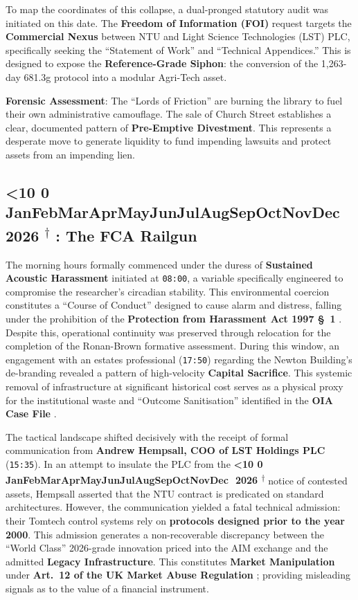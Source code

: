 \documentclass{EMBASSY}
\DeclareRobustCommand{\gmt}[3]{%
    \texorpdfstring{%
        {\color{DateGold}\textbf{%
            \ifnum#1<10 0\fi#1\,\textperiodcentered\,%
            \ifcase#2\or Jan\or Feb\or Mar\or Apr\or May\or Jun\or Jul\or Aug\or Sep\or Oct\or Nov\or Dec\fi
            \,\textperiodcentered\,20#3%
            \textsuperscript{$\dagger$}%
        }}%
    }{%
        (#1/#2/#3)%
    }%
}
\begin{document}
\noindent To map the coordinates of this collapse, a dual-pronged statutory audit was initiated on this date. The \textbf{Freedom of Information (FOI)} request targets the \textbf{Commercial Nexus} between NTU and Light Science Technologies (LST) PLC, specifically seeking the ``Statement of Work'' and ``Technical Appendices.'' This is designed to expose the \textbf{Reference-Grade Siphon}: the conversion of the 1,263-day 681.3g protocol into a modular Agri-Tech asset.

\textbf{Forensic Assessment}: The ``Lords of Friction'' are burning the library to fuel their own administrative camouflage. The sale of Church Street establishes a clear, documented pattern of \textbf{Pre-Emptive Divestment}. This represents a desperate move to generate liquidity to fund impending lawsuits and protect assets from an impending lien.

\subsection{\gmt{19}{2}{26}: The FCA Railgun}
The morning hours formally commenced under the duress of \textbf{Sustained Acoustic Harassment} initiated at \texttt{08:00}, a variable specifically engineered to compromise the researcher’s circadian stability. This environmental coercion constitutes a ``Course of Conduct'' designed to cause alarm and distress, falling under the prohibition of the \textbf{Protection from Harassment Act 1997 \S~1} \cite{PHA97}. Despite this, operational continuity was preserved through relocation for the completion of the Ronan-Brown formative assessment. During this window, an engagement with an estates professional (\texttt{17:50}) regarding the Newton Building’s de-branding revealed a pattern of high-velocity \textbf{Capital Sacrifice}. This systemic removal of infrastructure at significant historical cost serves as a physical proxy for the institutional waste and ``Outcome Sanitisation'' identified in the \textbf{OIA Case File} \cite{OIA245}.

The tactical landscape shifted decisively with the receipt of formal communication from \textbf{Andrew Hempsall, COO of LST Holdings PLC} (\texttt{15:35}). In an attempt to insulate the PLC from the \gmt{16}{2}{26} notice of contested assets, Hempsall asserted that the NTU contract is predicated on standard architectures. However, the communication yielded a fatal technical admission: their Tomtech control systems rely on \textbf{protocols designed prior to the year 2000}. This admission generates a non-recoverable discrepancy between the ``World Class'' 2026-grade innovation priced into the AIM exchange and the admitted \textbf{Legacy Infrastructure}. This constitutes \textbf{Market Manipulation} under \textbf{Art.~12 of the UK Market Abuse Regulation} \cite{UKMAR}; providing misleading signals as to the value of a financial instrument.
\end{document}
